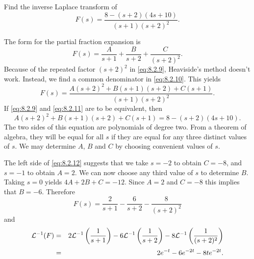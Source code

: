 \setcounter{example}{5}
\setcounter{equation}{8}
\begin{example}
  \label{example:8.2.6}\rm Find the inverse Laplace transform of
  \begin{equation}
    \label{eq:8.2.9}F(s)=\frac{8-(s+2)(4s+10)}{(s+1)(s+2)^{2}}.
  \end{equation}
\end{example}
\setcounter{equation}{9}
\begin{examplesolution}
\solution The form for the partial fraction expansion is
\begin{equation}
  \label{eq:8.2.10}F(s)=\frac{A}{s+1}+\frac{B}{s+2}+\frac{C}{(s+2)^{2}}.
\end{equation}
Because of the repeated factor $(s+2)^{2}$ in \eqref{eq:8.2.9}, Heaviside's method doesn't work.
Instead, we find a common denominator in \eqref{eq:8.2.10}. This yields
\begin{equation}
  \label{eq:8.2.11}F(s)=\frac{A(s+2)^{2}+B(s+1)(s+2)+C(s+1)}{(s+1)(s+2)^{2}}.
\end{equation}
If \eqref{eq:8.2.9} and \eqref{eq:8.2.11} are to be equivalent, then
\begin{equation}
  \label{eq:8.2.12}A(s+2)^{2}+B(s+1)(s+2)+C(s+1)=8-(s+2)(4s+10).
\end{equation}
The two sides of this equation are polynomials of degree two. From a theorem of algebra, they will
be equal for all $s$ if they are equal for any three distinct values of $s$. We may determine $A$,
$B$ and $C$ by choosing convenient values of $s$.

The left side of \eqref{eq:8.2.12} suggests that we take $s=-2$ to obtain $C=-8$, and $s=-1$ to
obtain $A=2$. We can now choose any third value of $s$ to determine $B$. Taking $s=0$ yields
$4A+2B+C=-12$. Since $A=2$ and $C=-8$ this implies that $B=-6$. Therefore
\[
  F(s)=\frac{2}{s+1}-\frac{6}{s+2}-\frac{8}{(s+2)^{2}}
\]
and
\begin{eqnarray*}
  {\cal L}^{-1}(F) & = & 2{\cal L}^{-1}\left(\frac{1}{s+1}\right)-6{\cal L}^{-1}\left(\frac{1}{s+2}\right)-8{\cal L}^{-1}\left(\frac{1}{(s+2)^{2}}\right) \\[1\jot]
                   & = & 2e^{-t}-6e^{-2t}-8te^{-2t}.
\end{eqnarray*}
\end{examplesolution}

